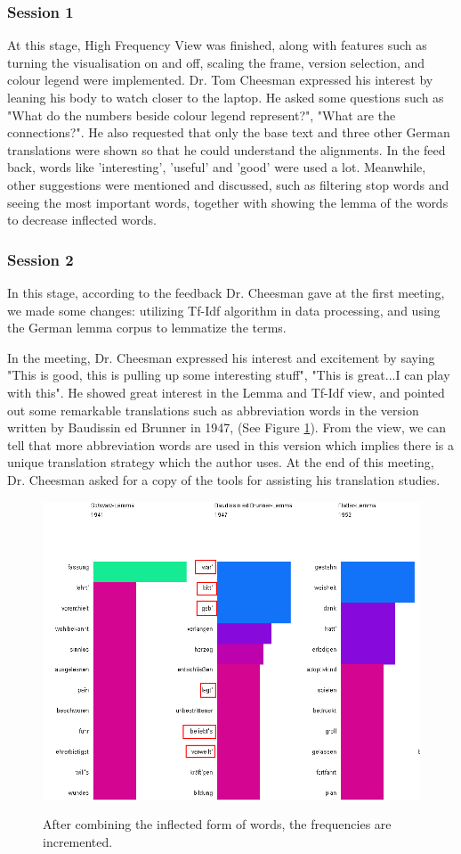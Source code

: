 \subsubsection{Session 1}

At this stage, High Frequency View was finished, along with features such as turning the visualisation on and off, scaling the frame, version selection, and colour legend were implemented. Dr. Tom Cheesman expressed his interest by leaning his body to watch closer to 
the laptop. He asked some questions such as "What do the numbers beside colour legend represent?", "What are the connections?". He also requested that only the base text and three other German translations were shown so that he could understand the alignments. In the feed back, words like 'interesting', 'useful' and 'good' were used a lot. Meanwhile, other suggestions were mentioned and discussed, such as filtering stop words and seeing the most important words, together with showing the lemma of the words to decrease inflected words.

\subsubsection{Session 2}

In this stage, according to the feedback Dr. Cheesman gave at the first meeting, we made some changes: utilizing Tf-Idf algorithm in data processing, and using the German lemma corpus to lemmatize the terms. 

In the meeting, Dr. Cheesman expressed his interest and excitement by saying "This is good, this is pulling up some interesting stuff", "This is great...I can play with this". He showed great interest in the Lemma and Tf-Idf view, and pointed out some remarkable translations such as abbreviation words in the version written by Baudissin ed Brunner in 1947, (See Figure \ref{fig:feedback}). From the view, we can tell that more abbreviation words are used in this version which implies there is a unique translation strategy which the author uses. At the end of this meeting, Dr. Cheesman asked for a copy of the tools for assisting his translation studies.

\begin{figure}[H]
	\centering	
	\includegraphics[scale=0.5]{Figs/Marking-Feedback}\\[1ex]
	\caption{After combining the inflected form of words, the frequencies are incremented.} 
	\label{fig:feedback}
\end{figure} 




